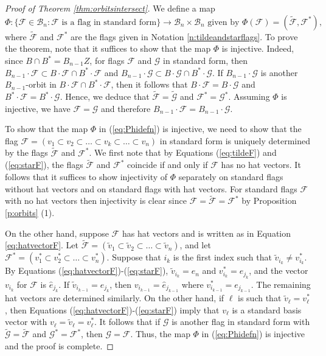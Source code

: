 \documentclass[12pt]{amsart}
\numberwithin{equation}{section}
\newcommand{\B}{\mathcal{B}}
\newcommand{\F}{\mathcal{F}}
\newcommand{\G}{\mathcal{G}}
\begin{document}
\begin{proof}[Proof of Theorem \ref{thm:orbitsintersect}]
We define a map 
\begin{equation}\label{eq:Phidefn}
\Phi: \{\F\in\B_{n}:\F \mbox{ is a flag in standard form} \}\to \B_{n}\times\B_{n} \mbox{ given by } \Phi(\F)=(\tilde{\F}, \F^{*}),
\end{equation}
where $\tilde{\F}$ and $\F^{*}$ are the flags given in Notation \ref{n:tildeandstarflags}.  
To prove the theorem, note that it suffices to show that the map $\Phi$ is injective.  Indeed, since $B\cap B^{*}=B_{n-1}Z$, for flags $\F$ and $\G$ in standard form, then $B_{n-1}\cdot \F \subset B\cdot\F \cap B^{*}\cdot \F$ and $B_{n-1}\cdot \G \subset B\cdot\G \cap B^{*}\cdot \G.$  If $B_{n-1}\cdot \G$ is another $B_{n-1}$-orbit in $B\cdot \F \cap B^{*}\cdot \F$,  then it follows that $B\cdot\F=B\cdot \G$ and $B^{*}\cdot \F=B^{*}\cdot \G$. Hence, we deduce 
that $\tilde{\F}=\tilde{\G}$ and $\F^{*}=\G^{*}.$  Assuming $\Phi$ is injective, we have
$\F=\G$ and therefore $B_{n-1}\cdot \F=B_{n-1}\cdot \G$. 

To show that the map $\Phi$ in (\ref{eq:Phidefn}) is injective, we need to show that the flag $\F=(v_{1}\subset v_{2}\subset \dots \subset v_{k}\subset \dots \subset v_{n})$ in standard form is uniquely determined by 
the flags $\tilde{\F}$ and $\F^{*}$.  We first note that by Equations (\ref{eq:tildeF}) and (\ref{eq:starF}), the flags $\tilde{\F}$ and $\F^*$ coincide if and only if $\F$ has no hat vectors.   It follows that it suffices to show injectivity of $\Phi$ separately on standard flags without hat vectors and on standard flags with hat vectors. For standard flags $\F$ with no hat vectors then injectivity is clear since $\F=\tilde{\F}=\F^{*}$ by Proposition \ref{p:orbits} (1).    

On the other hand, suppose $\F$ has hat vectors and is written as in Equation \eqref{eq:hatvectorF}.  Let $\tilde{\F}=(\tilde{v}_{1}\subset \tilde{v}_{2}\subset \dots\subset \tilde{v}_{n})$, and let $\F^{*}=(v_{1}^{*}\subset v_{2}^{*}\subset \dots \subset v_{n}^{*})$.  Suppose that $i_{k}$ is the first index such that $\tilde{v}_{i_{k}}\neq v_{i_{k}}^{*}$.  By Equations (\ref{eq:hatvectorF})-(\ref{eq:starF}), $\tilde{v}_{i_{k}}=e_{n}$ and $v_{i_{k}}^{*}=e_{j_{k}}$, and the vector $v_{i_{k}}$ for $\F$ is ${\hat{e}}_{j_{k}}$.  If $\tilde{v}_{i_{k-1}}=e_{j_{k}}$, then $v_{i_{k-1}}={\hat{e}}_{j_{k-1}}$ where $v_{i_{k-1}}^*=e_{j_{k-1}}$.  The remaining hat vectors are determined similarly.  On the other hand, if $\ell$ is such that $\tilde{v}_{\ell}=v_{\ell}^{*}$, then Equations (\ref{eq:hatvectorF})-(\ref{eq:starF}) imply that $v_{\ell}$ is a standard basis vector with $v_{\ell}=\tilde{v}_{\ell}=v^{*}_{\ell}$.  It follows that if $\G$ is another flag in standard form 
with $\tilde{\G}=\tilde{\F}$ and $\G^{*}=\F^{*}$, then $\G=\F$.   Thus, the map 
$\Phi$ in (\ref{eq:Phidefn}) is injective and the proof is complete.  


\end{proof}
\end{document}
